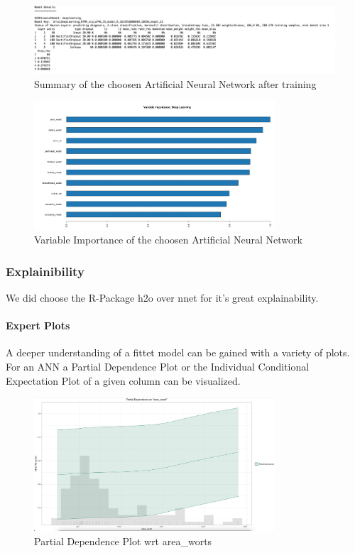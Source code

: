 \documentclass[]{article}
\let\oldparagraph\paragraph
\renewcommand{\paragraph}[1]{\oldparagraph{#1}\mbox{}}
\begin{document}
\begin{figure}
    \centering
    \includegraphics[width=1\textwidth]{images/model_details.png}
    \caption{Summary of the choosen Artificial Neural Network after training}
    \label{fig:model_details}
\end{figure}

\begin{figure}
    \centering
    \includegraphics[width=0.8\textwidth]{images/variable_importance.png}
    \caption{Variable Importance of the choosen Artificial Neural Network}
    \label{fig:variable_importance}
\end{figure}

\subsubsection{Explainibility}\label{explainibility}

We did choose the R-Package h2o over nnet for it's great explainability.

\paragraph{Expert Plots}\label{expert-plots}

A deeper understanding of a fittet model can be gained with a variety of
plots. For an ANN a Partial Dependence Plot or the Individual
Conditional Expectation Plot of a given column can be visualized.

\begin{figure}
    \centering
    \includegraphics[width=0.8\textwidth]{images/pd_plot.png}
    \caption{Partial Dependence Plot wrt area\_worts}
    \label{fig:pd_plot}
\end{figure}
\end{document}
